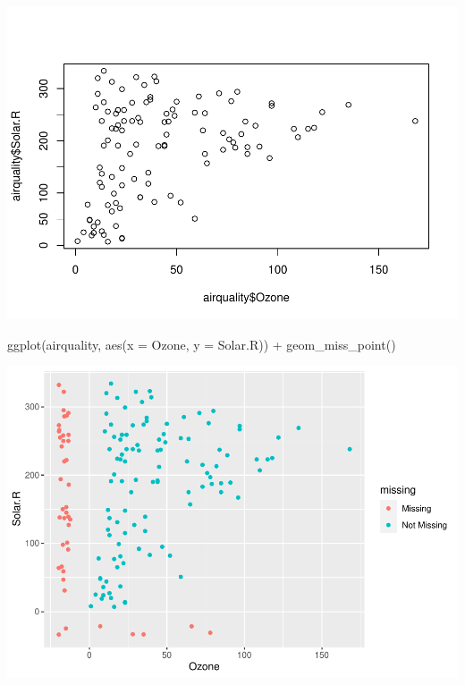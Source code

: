 \documentclass[
  12pt,
]{article}
\newenvironment{Shaded}{\begin{snugshade}}{\end{snugshade}}
\newcommand{\AttributeTok}[1]{\textcolor[rgb]{0.77,0.63,0.00}{#1}}
\newcommand{\FunctionTok}[1]{\textcolor[rgb]{0.00,0.00,0.00}{#1}}
\newcommand{\NormalTok}[1]{#1}
\newcommand{\SpecialCharTok}[1]{\textcolor[rgb]{0.00,0.00,0.00}{#1}}
\begin{document}
\begin{Shaded}
\end{Shaded}

\includegraphics{articleCustomerDropoutMembership_files/figure-latex/Stats1-5.pdf}

\begin{Shaded}
\begin{Highlighting}[]
\FunctionTok{ggplot}\NormalTok{(airquality, }\FunctionTok{aes}\NormalTok{(}\AttributeTok{x =}\NormalTok{ Ozone, }\AttributeTok{y =}\NormalTok{ Solar.R)) }\SpecialCharTok{+}
\FunctionTok{geom\_miss\_point}\NormalTok{()}
\end{Highlighting}
\end{Shaded}

\includegraphics{articleCustomerDropoutMembership_files/figure-latex/Stats1-6.pdf}
\end{document}
